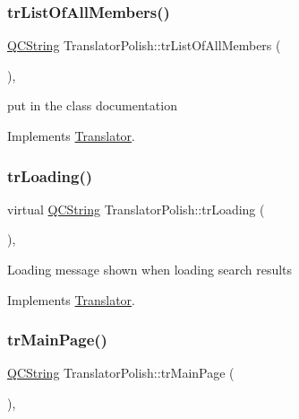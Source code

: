 \subsubsection{\texorpdfstring{trListOfAllMembers()}{trListOfAllMembers()}}
{\footnotesize\ttfamily \mbox{\hyperlink{class_q_c_string}{Q\+C\+String}} Translator\+Polish\+::tr\+List\+Of\+All\+Members (\begin{DoxyParamCaption}{ }\end{DoxyParamCaption})\hspace{0.3cm}{\ttfamily [inline]}, {\ttfamily [virtual]}}

put in the class documentation 

Implements \mbox{\hyperlink{class_translator}{Translator}}.

\mbox{\label{class_translator_polish_aa1d9901386ec38bae265798731cbfc7d}} 
\subsubsection{\texorpdfstring{trLoading()}{trLoading()}}
{\footnotesize\ttfamily virtual \mbox{\hyperlink{class_q_c_string}{Q\+C\+String}} Translator\+Polish\+::tr\+Loading (\begin{DoxyParamCaption}{ }\end{DoxyParamCaption})\hspace{0.3cm}{\ttfamily [inline]}, {\ttfamily [virtual]}}

Loading message shown when loading search results 

Implements \mbox{\hyperlink{class_translator}{Translator}}.

\mbox{\label{class_translator_polish_a033eef7792589d29b8a22048d6181a25}} 
\subsubsection{\texorpdfstring{trMainPage()}{trMainPage()}}
{\footnotesize\ttfamily \mbox{\hyperlink{class_q_c_string}{Q\+C\+String}} Translator\+Polish\+::tr\+Main\+Page (\begin{DoxyParamCaption}{ }\end{DoxyParamCaption})\hspace{0.3cm}{\ttfamily [inline]}, {\ttfamily [virtual]}}

